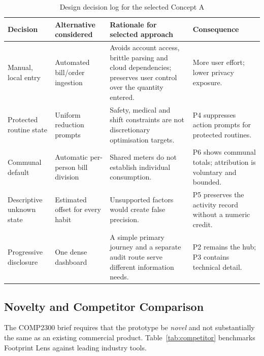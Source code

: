 \documentclass[12pt,a4paper]{article}
\begin{document}
\begin{table}[ht]
\centering
\small
\caption{Design decision log for the selected Concept A}
\label{tab:decision-log}
\begin{tabularx}{\textwidth}{@{}>{\raggedright\arraybackslash}p{2.45cm}>{\raggedright\arraybackslash}p{3.0cm}>{\raggedright\arraybackslash}X>{\raggedright\arraybackslash}p{2.5cm}@{}}
\toprule
\textbf{Decision} & \textbf{Alternative considered} & \textbf{Rationale for selected approach} & \textbf{Consequence}\\
\midrule
Manual, local entry & Automated bill/order ingestion & Avoids account access, brittle parsing and cloud dependencies; preserves user control over the quantity entered. & More user effort; lower privacy exposure.\\
\rowcolor{brandlight}
Protected routine state & Uniform reduction prompts & Safety, medical and shift constraints are not discretionary optimisation targets. & P4 suppresses action prompts for protected routines.\\
Communal default & Automatic per-person bill division & Shared meters do not establish individual consumption. & P6 shows communal totals; attribution is voluntary and bounded.\\
\rowcolor{brandlight}
Descriptive unknown state & Estimated offset for every habit & Unsupported factors would create false precision. & P5 preserves the activity record without a numeric credit.\\
Progressive disclosure & One dense dashboard & A simple primary journey and a separate audit route serve different information needs. & P2 remains the hub; P3 contains technical detail.\\
\bottomrule
\end{tabularx}
\end{table}

\subsection{Novelty and Competitor Comparison}
The COMP2300 brief requires that the prototype be \emph{novel} and not substantially the same as an existing commercial product. Table~\ref{tab:competitor} benchmarks Footprint Lens against leading industry tools.
\end{document}
